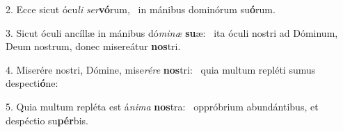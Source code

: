 2. Ecce sicut ócu\textit{li} \textit{ser}\textbf{vó}rum, \ast\  in mánibus dominórum su\textbf{ó}rum.\

3. Sicut óculi ancíllæ in mánibus dó\textit{mi}\textit{næ} \textbf{su}æ: \ast\  ita óculi nostri ad Dóminum, Deum nostrum, donec misereátur \textbf{nos}tri.\

4. Miserére nostri, Dómine, mise\textit{ré}\textit{re} \textbf{nos}tri: \ast\  quia multum repléti sumus despecti\textbf{ó}ne:\

5. Quia multum repléta est á\textit{ni}\textit{ma} \textbf{nos}tra: \ast\  oppróbrium abundántibus, et despéctio su\textbf{pér}bis.\

